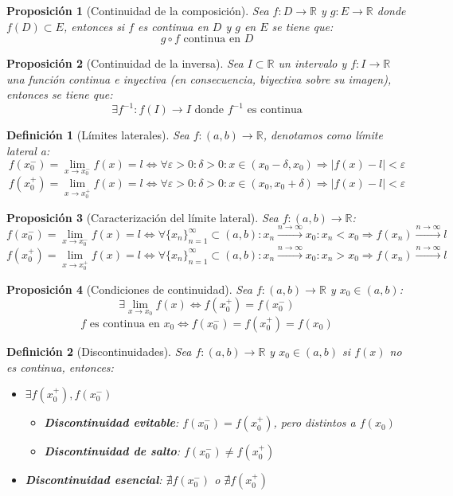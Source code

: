 \documentclass[10pt,a4paper,openright]{book}
\newtheorem{proposicion}{Proposición}[chapter]
\newtheorem{definicion}{Definición}[chapter]
\begin{document}
\begin{proposicion}[Continuidad de la composición]
Sea $f: D\rightarrow \mathbb R$ y $g: E\rightarrow \mathbb R$ donde $f(D)\subset E$, entonces si $f$ es continua en $D$ y $g$ en $E$ se tiene que:
$$g\circ f\mbox{ continua en }D$$
\end{proposicion}

\begin{proposicion}[Continuidad de la inversa]
Sea $I\subset \mathbb R$ un intervalo y $f: I\rightarrow \mathbb R $ una función continua e inyectiva (en consecuencia, biyectiva sobre su imagen), entonces se tiene que:
$$\exists f^{-1}: f(I)\rightarrow I \mbox{ donde }f^{-1}\mbox{ es continua}$$ 
\end{proposicion}

\begin{definicion}[Límites laterales]
Sea $f: (a,b)\rightarrow \mathbb R$, denotamos como límite lateral a:
$$f(x_0^-)=\lim_{x\rightarrow x_0^-}f(x)=l \Leftrightarrow \forall\varepsilon>0: \delta >0: x\in (x_0-\delta, x_0)\Rightarrow |f(x)-l|<\varepsilon$$
$$f(x_0^+)=\lim_{x\rightarrow x_0^+}f(x)=l \Leftrightarrow \forall\varepsilon>0: \delta >0: x\in (x_0, x_0+ \delta)\Rightarrow |f(x)-l|<\varepsilon$$
\end{definicion}

\begin{proposicion}[Caracterización del límite lateral]
Sea $f: (a,b)\rightarrow \mathbb R$:
$$f(x_0^-)=\lim_{x\rightarrow x_0^-}f(x)=l \Leftrightarrow \forall \{x_n\}_{n=1}^\infty \subset (a,b): x_n\xrightarrow{n\rightarrow \infty}x_0: x_n< x_0 \Rightarrow f(x_n)\xrightarrow{n\rightarrow \infty} l$$
$$f(x_0^+)=\lim_{x\rightarrow x_0^+}f(x)=l \Leftrightarrow \forall \{x_n\}_{n=1}^\infty \subset (a,b): x_n\xrightarrow{n\rightarrow \infty}x_0: x_n> x_0 \Rightarrow f(x_n)\xrightarrow{n\rightarrow \infty} l$$
\end{proposicion}

\begin{proposicion}[Condiciones de continuidad]
Sea $f: (a,b)\rightarrow \mathbb R$ y $x_0\in (a,b)$:
$$\exists \lim_{x\rightarrow x_0}f(x)\Leftrightarrow f(x_0^+)=f(x_0^-)$$
$$f\mbox{ es continua en }x_0 \Leftrightarrow f(x_0^-)=f(x_0^+)=f(x_0)$$
\end{proposicion}

\begin{definicion}[Discontinuidades]
Sea $f: (a,b)\longrightarrow \mathbb R$ y $x_0\in (a,b)$ si $f(x)$ no es continua, entonces:
\begin{itemize}
\item $\exists f(x_0^+), f(x_0^-)$
	\begin{itemize}
	\item \textbf{Discontinuidad evitable}: $f(x_0^-)=f(x_0^+)$, pero distintos a $f(x_0)$
	\item \textbf{Discontinuidad de salto}: $f(x_0^-)\neq f(x_0^+)$
	\end{itemize}

\item \textbf{Discontinuidad esencial}: $\nexists f(x_0^-)$ o $\nexists f(x_0^+)$
\end{itemize}
\end{definicion}
\end{document}
